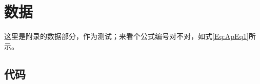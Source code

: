 \chapter{数据}
这里是附录的数据部分，作为测试；来看个公式编号对不对，如式\eqref{Eq:ApEq1}所示。

	
\section{代码}



\listoffigures
\listoftables




